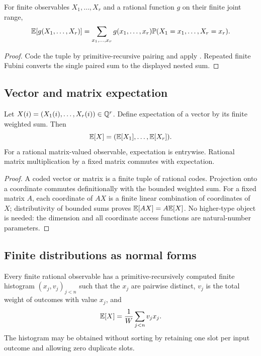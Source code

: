 \begin{corollary}\label{cor:multi-lotus}
For finite observables \(X_1,\ldots,X_r\) and a rational function \(g\) on
their finite joint range,
\[
 \mathbb E[g(X_1,\ldots,X_r)]
 =\sum_{x_1,\ldots,x_r}g(x_1,\ldots,x_r)
   \mathbb P(X_1=x_1,\ldots,X_r=x_r).
\]
\end{corollary}

\begin{proof}
Code the tuple by primitive-recursive pairing and apply
.  Repeated finite Fubini converts the single paired
sum to the displayed nested sum.
\end{proof}

\subsection{Vector and matrix expectation}

\begin{theorem}\label{thm:componentwise}
Let \(X(i)=(X_1(i),\ldots,X_r(i))\in\mathbb Q^r\).  Define expectation of a vector by
its finite weighted sum.  Then
\[
 \mathbb E[X]=(\mathbb E[X_1],\ldots,\mathbb E[X_r]).
\]
For a rational matrix-valued observable, expectation is entrywise.  Rational
matrix multiplication by a fixed matrix commutes with expectation.
\end{theorem}

\begin{proof}
A coded vector or matrix is a finite tuple of rational codes.  Projection onto
a coordinate commutes definitionally with the bounded weighted sum.  For a
fixed matrix \(A\), each coordinate of \(AX\) is a finite linear combination
of coordinates of \(X\); distributivity of bounded sums proves
\(\mathbb E[AX]=A\mathbb E[X]\).  No higher-type object is needed: the dimension and all
coordinate access functions are natural-number parameters.
\end{proof}

\subsection{Finite distributions as normal forms}

\begin{proposition}\label{prop:histogram}
Every finite rational observable has a primitive-recursively computed finite
histogram \((x_j,v_j)_{j<n}\) such that the \(x_j\) are pairwise distinct,
\(v_j\) is the total weight of outcomes with value \(x_j\), and
\[
 \mathbb E[X]=\frac1W\sum_{j<n}v_jx_j.
\]
The histogram may be obtained without sorting by retaining one slot per input
outcome and allowing zero duplicate slots.
\end{proposition}

